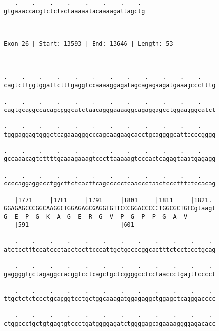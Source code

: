 \documentclass{article}
\begin{document}
\begin{Verbatim}
   .    .    .    .    .    .    .    . 
gtgaaaccacgtctctactaaaaatacaaaagattagctg
                                        
                                        
 
Exon 26 | Start: 13593 | End: 13646 | Length: 53



.    .    .    .    .    .    .    .    .    .    .    .    
cagtcttggtggattctttgaggtccaaaaggagatagcagagaagatgaaagccctttg
                                                            
.    .    .    .    .    .    .    .    .    .    .    .    
cagtgcaggccacagcgggcatctaacagggaaaaggcagaggagcctggaagggcatct
                                                            
.    .    .    .    .    .    .    .    .    .    .    .    
tgggaggagtgggctcagaaagggcccagcaagaagcacctgcaggggcattccccgggg
                                                            
.    .    .    .    .    .    .    .    .    .    .    .    
gccaaacagtcttttgaaaagaaagtcccttaaaaagtcccactcagagtaaatgagagg
                                                            
.    .    .    .    .    .    .    .    .    .    .    .    
ccccaggaggccctggcttctcacttcagccccctcaaccctaactccctttctccacag
                                                            
   |1771     |1781     |1791     |1801     |1811     |1821. 
GGAGAGCCCGGCAAGGCTGGAGAGCGAGGTGTTCCCGGACCCCCTGGCGCTGTCgtaagt
G  E  P  G  K  A  G  E  R  G  V  P  G  P  P  G  A  V        
   |591                          |601                       
  
   .    .    .    .    .    .    .    .    .    .    .    . 
atctcctttccatccctacctccttcccattgctgccccggcactttctcctccctgcag
                                                            
   .    .    .    .    .    .    .    .    .    .    .    . 
gaggggtgctagaggccacggtcctcagctgctcggggcctcctaaccctgagttcccct
                                                            
   .    .    .    .    .    .    .    .    .    .    .    . 
ttgctctctccctgcagggtcctgctggcaaagatggagaggctggagctcagggacccc
                                                            
   .    .    .    .    .    .    .    .    .    .    .    . 
ctggccctgctgtgagtgtccctgatggggagatctggggagcagaaaaggggagacacc
                                                            

\end{Verbatim}
\end{document}
